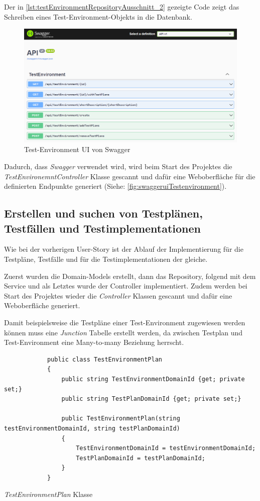 \documentclass[a4paper, fontsize=11pt, parskip=half, twoside]{scrreprt}
\begin{document}
	Der in \autoref{lst:testEnvironmentRepositoryAusschnitt_2} gezeigte Code zeigt das Schreiben eines Test-Environment-Objekts in die Datenbank.
	
	\begin{figure}[ht]
		\centering
		\includegraphics[scale=0.5]{assets/swaggerui_testenvironment.png}
		\caption{Test-Environment \ac{UI} von Swagger}
		\label{fig:swaggeruiTestenvironment}
	\end{figure}

	Dadurch, dass \emph{Swagger} verwendet wird, wird beim Start des Projektes die \emph{TestEnvironemntController} Klasse gescannt und dafür eine Weboberfläche für die definierten Endpunkte generiert (Siehe: \autoref{fig:swaggeruiTestenvironment}).
	
	\subsection{Erstellen und suchen von Testplänen, Testfällen und Testimplementationen} \label{subsec:createAndSearchTestplans}
	Wie bei der vorherigen User-Story ist der Ablauf der Implementierung für die Testpläne, Testfälle und für die Testimplementationen der gleiche.
	
	Zuerst wurden die Domain-Models erstellt, dann das Repository, folgend mit dem Service und als Letztes wurde der Controller implementiert.
	Zudem werden bei Start des Projektes wieder die \emph{Controller} Klassen gescannt und dafür eine Weboberfläche generiert.
	
	Damit beispielsweise die Testpläne einer Test-Environment zugewiesen werden können muss eine \emph{Junction} Tabelle erstellt werden, da zwischen Testplan und Test-Environment eine Many-to-many Beziehung herrscht.
	
	\newpage
	
	\begin{listing}[ht]
		\begin{verbatim}
			public class TestEnvironmentPlan
			{
				public string TestEnvironmentDomainId {get; private set;}
				public string TestPlanDomainId {get; private set;}
				
				public TestEnvironmentPlan(string testEnvironmentDomainId, string testPlanDomainId)
				{
					TestEnvironmentDomainId = testEnvironmentDomainId;
					TestPlanDomainId = testPlanDomainId;
				}
			}
		\end{verbatim}
		\caption{\emph{TestEnvironmentPlan} Klasse}
		\label{lst:testEnvironmentPlanClass}
	\end{listing}
	
\end{document}
